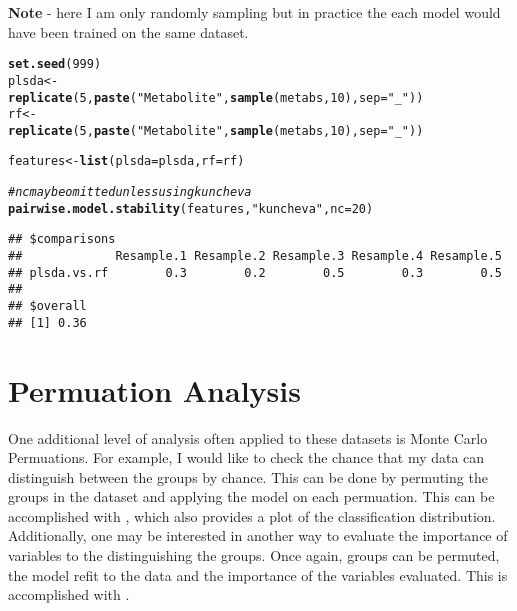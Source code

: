 \documentclass[12pt]{article}\usepackage[]{graphicx}\usepackage[usenames,dvipsnames]{color}
\makeatletter
\newcommand{\hlnum}[1]{\textcolor[rgb]{0.686,0.059,0.569}{#1}}%
\newcommand{\hlstr}[1]{\textcolor[rgb]{0.192,0.494,0.8}{#1}}%
\newcommand{\hlcom}[1]{\textcolor[rgb]{0.678,0.584,0.686}{\textit{#1}}}%
\newcommand{\hlstd}[1]{\textcolor[rgb]{0.345,0.345,0.345}{#1}}%
\newcommand{\hlkwb}[1]{\textcolor[rgb]{0.69,0.353,0.396}{#1}}%
\newcommand{\hlkwc}[1]{\textcolor[rgb]{0.333,0.667,0.333}{#1}}%
\newcommand{\hlkwd}[1]{\textcolor[rgb]{0.737,0.353,0.396}{\textbf{#1}}}%
\newenvironment{kframe}{%
 \def\at@end@of@kframe{}%
 \ifinner\ifhmode%
  \def\at@end@of@kframe{\end{minipage}}%
  \begin{minipage}{\columnwidth}%
 \fi\fi%
 \def\FrameCommand##1{\hskip\@totalleftmargin \hskip-\fboxsep
 \colorbox{shadecolor}{##1}\hskip-\fboxsep
     \hskip-\linewidth \hskip-\@totalleftmargin \hskip\columnwidth}%
 \MakeFramed {\advance\hsize-\width
   \@totalleftmargin\z@ \linewidth\hsize
   \@setminipage}}%
 {\par\unskip\endMakeFramed%
 \at@end@of@kframe}
\newenvironment{knitrout}{}{} %
\makeatother
\begin{document}
\textbf{Note} - here I am only randomly sampling but in practice the each model
would have been trained on the same dataset. 

\begin{knitrout}
\color{fgcolor}\begin{kframe}
\begin{alltt}
\hlkwd{set.seed}\hlstd{(}\hlnum{999}\hlstd{)}
\hlstd{plsda} \hlkwb{<-}
    \hlkwd{replicate}\hlstd{(}\hlnum{5}\hlstd{,} \hlkwd{paste}\hlstd{(}\hlstr{"Metabolite"}\hlstd{,} \hlkwd{sample}\hlstd{(metabs,} \hlnum{10}\hlstd{),} \hlkwc{sep}\hlstd{=}\hlstr{"_"}\hlstd{))}
\hlstd{rf} \hlkwb{<-}
    \hlkwd{replicate}\hlstd{(}\hlnum{5}\hlstd{,} \hlkwd{paste}\hlstd{(}\hlstr{"Metabolite"}\hlstd{,} \hlkwd{sample}\hlstd{(metabs,} \hlnum{10}\hlstd{),} \hlkwc{sep}\hlstd{=}\hlstr{"_"}\hlstd{))}

\hlstd{features} \hlkwb{<-} \hlkwd{list}\hlstd{(}\hlkwc{plsda}\hlstd{=plsda,} \hlkwc{rf}\hlstd{=rf)}

\hlcom{# nc may be omitted unless using kuncheva}
\hlkwd{pairwise.model.stability}\hlstd{(features,} \hlstr{"kuncheva"}\hlstd{,} \hlkwc{nc}\hlstd{=}\hlnum{20}\hlstd{)}
\end{alltt}
\begin{verbatim}
## $comparisons
##             Resample.1 Resample.2 Resample.3 Resample.4 Resample.5
## plsda.vs.rf        0.3        0.2        0.5        0.3        0.5
## 
## $overall
## [1] 0.36
\end{verbatim}
\end{kframe}
\end{knitrout}

\newpage
\section{Permuation Analysis}

One additional level of analysis often applied to these datasets is Monte
Carlo Permuations.  For example, I would like to check the chance that
my data can distinguish between the groups by chance.  This can be done by
permuting the groups in the dataset and applying the model on each permuation.
This can be accomplished with , which also provides a 
plot of the classification distribution.  Additionally, one may
be interested in another way to evaluate the importance of variables to the 
distinguishing the groups.  Once again, groups can be permuted, the model
refit to the data and the importance of the variables evaluated.  This is
accomplished with .
\end{document}
